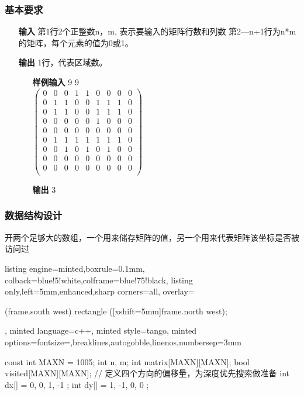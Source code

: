 \documentclass[12pt]{article}
\begin{document}
\subsubsection{基本要求}
\begin{enumerate}
    \item[\textbf{输入}] 第1行2个正整数n，m, 表示要输入的矩阵行数和列数
第2—n+1行为n*m的矩阵，每个元素的值为0或1。
    \item[\textbf{输出}] 1行，代表区域数。
    \begin{enumerate}
        \item[\textbf{样例输入}] 9 9\\
        $\begin{pmatrix}
            0&0&0&1&1&0&0&0&0 \\
            0&1&1&0&0&1&1&1&0 \\
            0&1&1&0&0&1&1&1&0 \\
            0&0&0&0&0&1&0&0&0 \\
            0&0&0&0&0&0&0&0&0 \\
            0&1&1&1&1&1&1&1&0 \\
            0&0&1&0&1&0&1&0&0 \\
            0&0&0&0&0&0&0&0&0 \\
            0&0&0&0&0&0&0&0&0 \\
        \end{pmatrix}$
        \item[\textbf{输出}] 3
    \end{enumerate}
\end{enumerate}
\subsubsection{数据结构设计}
{\songti 开两个足够大的数组，一个用来储存矩阵的值，另一个用来代表矩阵该坐标是否被访问过}
\begin{tcblisting}{listing engine=minted,boxrule=0.1mm,
colback=blue!5!white,colframe=blue!75!black,
listing only,left=5mm,enhanced,sharp corners=all,
overlay={\begin{tcbclipinterior} (frame.south west)
rectangle ([xshift=5mm]frame.north west);\end{tcbclipinterior}},
minted language=c++,
minted style=tango,
minted options={fontsize=\small,breaklines,autogobble,linenos,numbersep=3mm}}
const int MAXN = 1005;
int n, m;
int matrix[MAXN][MAXN];
bool visited[MAXN][MAXN];
// 定义四个方向的偏移量，为深度优先搜索做准备
int dx[] = { 0, 0, 1, -1 };
int dy[] = { 1, -1, 0, 0 };
\end{tcblisting}
\end{document}
